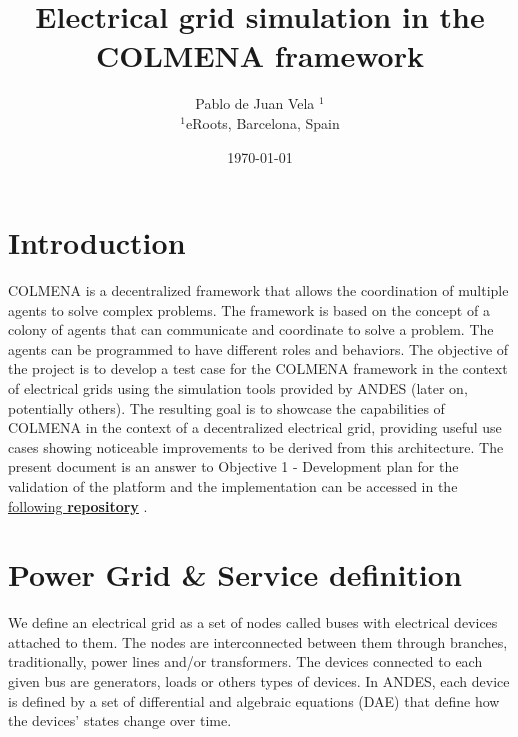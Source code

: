 \documentclass{article}
\title{Electrical grid simulation in the COLMENA framework}
\author{Pablo de Juan Vela $^{1}$ \\
        \small $^{1}$eRoots, Barcelona, Spain \\
}
\date{\today}
\begin{document}
\maketitle

\section{Introduction}
COLMENA is a decentralized framework that allows the coordination of multiple agents to solve complex problems. The framework is based on the concept of a colony of agents that can communicate and coordinate to solve a problem. The agents can be programmed to have different roles and behaviors. The objective of the project is to develop a test case for the COLMENA framework in the context of electrical grids using the simulation tools provided by ANDES \cite{grids:models}(later on, potentially others). The resulting goal is to showcase the capabilities of COLMENA in the context of a decentralized electrical grid, providing useful use cases showing noticeable improvements to be derived from this architecture. The present document is an answer to Objective 1 - Development plan for the validation of the platform and the implementation can be accessed in the\href{https://github.com/eRoots-Analytics/COLMENA}{ following \textbf{repository}} \cite{git:eroots}.




\section{Power Grid \& Service definition}
We define an electrical grid as a set of nodes called buses with electrical devices attached to them. The nodes are interconnected between them through branches, traditionally, power lines and/or transformers. The devices connected to each given bus are generators, loads or others types of devices. In ANDES, each device is defined by a set of differential and algebraic equations (DAE) that define how the devices' states change over time.


\end{document}
